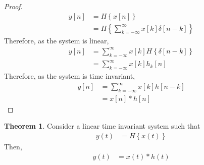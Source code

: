 \documentclass[titlepage, fleqn, a4paper, 12pt, twoside]{article}
\theoremstyle{definition}
\theoremstyle{theorem}
\newtheorem{theorem}{Theorem}
\begin{document}
\begin{proof}
	\begin{align*}
		y[n] & = H\left\{ x[n] \right\} \\
                     & = H\left\{ \sum\limits_{k = -\infty}^{\infty} x[k] \delta[n - k] \right\}
	\end{align*}
	Therefore, as the system is linear,
	\begin{align*}
		y[n] & = \sum\limits_{k = -\infty}^{\infty} x[k] H\left\{ \delta[n - k] \right\} \\
                     & = \sum\limits_{k = -\infty}^{ \infty} x[k] h_k[n]
	\end{align*}
	Therefore, as the system is time invariant,
	\begin{align*}
		y[n] & = \sum\limits_{k = -\infty}^{\infty} x[k] h[n - k] \\
                     & = x[n] \ast h[n]
	\end{align*}
\end{proof}

\begin{theorem}
	Consider a linear time invariant system such that
	\begin{align*}
		y(t) & = H\left\{ x(t) \right\}
	\end{align*}
	Then,
	\begin{align*}
		y(t) & = x(t) \ast h(t)
	\end{align*}
\end{theorem}
\end{document}
